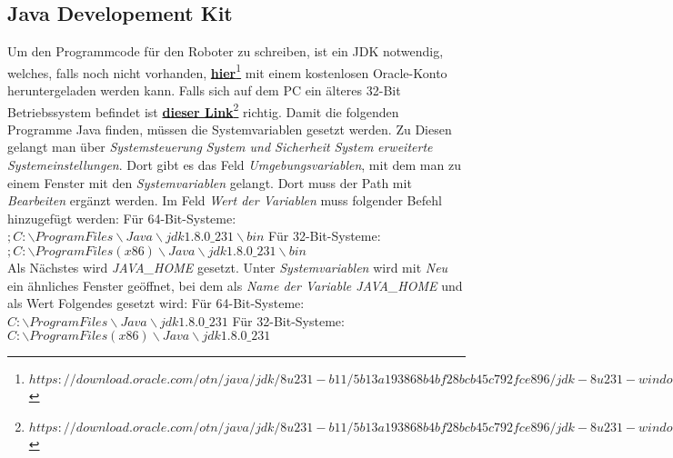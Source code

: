 \documentclass[
	ngerman,
	accentcolor=1c,%
	]{tudapub}
\begin{document}
\subsection{Java Developement Kit}
Um den Programmcode f\"ur den Roboter zu schreiben, ist ein JDK notwendig, welches, falls noch nicht vorhanden, 
\href{https://download.oracle.com/otn/java/jdk/8u231-b11/5b13a193868b4bf28bcb45c792fce896/jdk-8u231-windows-x64.exe}{\textbf{hier}\footnote{$https://download.oracle.com/otn/java/jdk/8u231-b11/5b13a193868b4bf28bcb45c792fce896/jdk-8u231-windows-x64.exe$}}
mit einem kostenlosen Oracle-Konto heruntergeladen werden kann. Falls sich auf dem PC ein \"alteres 32-Bit Betriebssystem befindet ist 
\href{https://download.oracle.com/otn/java/jdk/8u231-b11/5b13a193868b4bf28bcb45c792fce896/jdk-8u231-windows-i586.exe}{\textbf{dieser Link}\footnote{$https://download.oracle.com/otn/java/jdk/8u231-b11/5b13a193868b4bf28bcb45c792fce896/jdk-8u231-windows-i586.exe$}}
richtig.\newline
Damit die folgenden Programme Java finden, m\"ussen die Systemvariablen gesetzt werden. Zu Diesen gelangt man \"uber \textit{Systemsteuerung} \rightarrow{} \textit{System und Sicherheit} \rightarrow{} \textit{System} \rightarrow{} \textit{erweiterte Systemeinstellungen}. Dort gibt es das Feld \textit{Umgebungsvariablen}, mit dem man zu einem Fenster mit den \textit{Systemvariablen} gelangt. Dort muss der Path mit \textit{Bearbeiten} erg\"anzt werden. Im Feld \textit{Wert der Variablen} muss folgender Befehl hinzugef\"ugt werden:\newline
F\"ur 64-Bit-Systeme:\\$;C:\backslash ProgramFiles\backslash Java\backslash jdk1.8.0\_231\backslash bin$\newline
F\"ur 32-Bit-Systeme:\\$;C:\backslash ProgramFiles(x86)\backslash Java\backslash jdk1.8.0\_231\backslash bin$\\
Als N\"achstes wird \textit{JAVA\_HOME} gesetzt. Unter \textit{Systemvariablen} wird mit \textit{Neu} ein \"ahnliches Fenster ge\"offnet, bei dem als  \textit{Name der Variable JAVA\_HOME} und als Wert Folgendes gesetzt wird:\newline
F\"ur 64-Bit-Systeme:\\$C:\backslash ProgramFiles\backslash Java\backslash jdk1.8.0\_231$\newline
F\"ur 32-Bit-Systeme:\\$C:\backslash ProgramFiles(x86)\backslash Java\backslash jdk1.8.0\_231$\\
\end{document}
